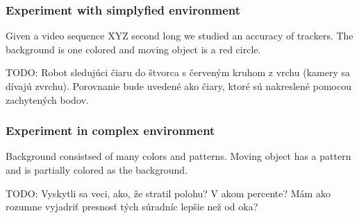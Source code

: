 \subsubsection{Experiment with simplyfied environment}

Given a video sequence XYZ second long we studied an accuracy of trackers. The background is one colored and moving object is a red circle.

TODO: Robot sledujúci čiaru do štvorca s červeným kruhom z vrchu (kamery sa dívajú zvrchu). Porovnanie bude uvedené ako čiary, ktoré sú nakreslené pomocou zachytených bodov.

\subsubsection{Experiment in complex environment}

Background consistsed of many colors and patterns. Moving object has a pattern and is partially colored as the background.

TODO: Vyskytli sa veci, ako, že stratil polohu? V akom percente? Mám ako rozumne vyjadriť presnosť tých súradníc lepšie než od oka?
